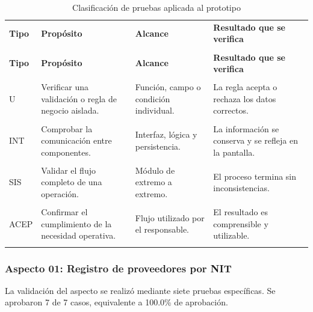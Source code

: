 \begin{xltabular}{\linewidth}{p{1.6cm}X p{3.1cm}p{3.1cm}}

\caption{Clasificación de pruebas aplicada al prototipo}\label{tab:cap4_tipos_prueba}\\
\toprule
\textbf{Tipo} & \textbf{Propósito} & \textbf{Alcance} & \textbf{Resultado que se verifica}\\\\
\midrule
\endfirsthead
\toprule
\textbf{Tipo} & \textbf{Propósito} & \textbf{Alcance} & \textbf{Resultado que se verifica}\\\\
\midrule
\endhead
\endfoot
\bottomrule
\endlastfoot
U & Verificar una validación o regla de negocio aislada. & Función, campo o condición individual. & La regla acepta o rechaza los datos correctos.\\\\
INT & Comprobar la comunicación entre componentes. & Interfaz, lógica y persistencia. & La información se conserva y se refleja en la pantalla.\\\\
SIS & Validar el flujo completo de una operación. & Módulo de extremo a extremo. & El proceso termina sin inconsistencias.\\\\
ACEP & Confirmar el cumplimiento de la necesidad operativa. & Flujo utilizado por el responsable. & El resultado es comprensible y utilizable.\\\\
\end{xltabular}

\subsubsection{Aspecto 01: Registro de proveedores por NIT}
La validación del aspecto se realizó mediante siete pruebas específicas. Se aprobaron 7 de 7 casos, equivalente a 100.0\% de aprobación.

